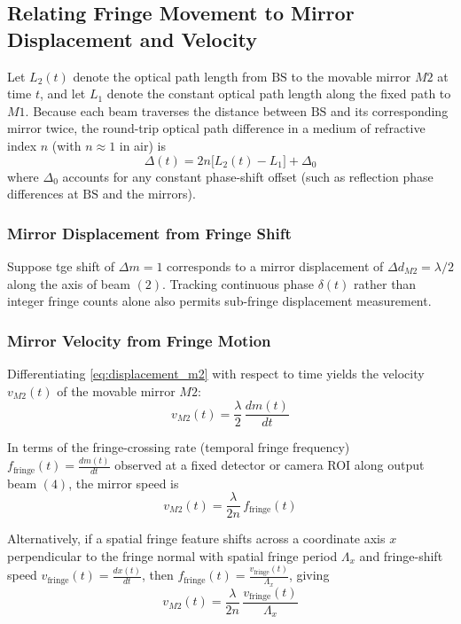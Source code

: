 
\subsection{Relating Fringe Movement to Mirror Displacement and Velocity}
\label{sec:fringe_to_displacement_velocity}

Let $L_2(t)$ denote the optical path length from $\text{BS}$ to the movable mirror $M2$ at time $t$, and let $L_1$ denote the constant optical path length along the fixed path to $M1$. Because each beam traverses the distance between $\text{BS}$ and its corresponding mirror twice, the round-trip optical path difference in a medium of refractive index $n$ (with $n \approx 1$ in air) is
\begin{equation}
    \Delta(t) = 2n\bigl[L_2(t) - L_1\bigr] + \Delta_0
    \label{eq:opd_m2}
\end{equation}
where $\Delta_0$ accounts for any constant phase-shift offset (such as reflection phase differences at $\text{BS}$ and the mirrors).

\subsubsection{Mirror Displacement from Fringe Shift}
Suppose tge shift of $\Delta m = 1$ corresponds to a mirror displacement of $\Delta d_{M2} = \lambda/2$ along the axis of beam $(2)$. Tracking continuous phase $\delta(t)$ rather than integer fringe counts alone also permits sub-fringe displacement measurement.

\subsubsection{Mirror Velocity from Fringe Motion}
Differentiating \cref{eq:displacement_m2} with respect to time yields the velocity $v_{M2}(t)$ of the movable mirror $M2$:
\begin{equation}
    v_{M2}(t) = \frac{\lambda}{2}\,\frac{dm(t)}{dt}
    \label{eq:velocity_m2}
\end{equation}

In terms of the fringe-crossing rate (temporal fringe frequency) $f_{\text{fringe}}(t) = \frac{dm(t)}{dt}$ observed at a fixed detector or camera ROI along output beam $(4)$, the mirror speed is
\begin{equation}
    v_{M2}(t) = \frac{\lambda}{2n}\,f_{\text{fringe}}(t)
    \label{eq:velocity_fringe_rate}
\end{equation}


Alternatively, if a spatial fringe feature shifts across a coordinate axis $x$ perpendicular to the fringe normal with spatial fringe period $\Lambda_x$ and fringe-shift speed $v_{\text{fringe}}(t) = \frac{dx(t)}{dt}$, then $f_{\text{fringe}}(t) = \frac{v_{\text{fringe}}(t)}{\Lambda_x}$, giving
\begin{equation}
    v_{M2}(t) = \frac{\lambda}{2n}\,\frac{v_{\text{fringe}}(t)}{\Lambda_x}
    \label{eq:velocity_spatial_shift}
\end{equation}


